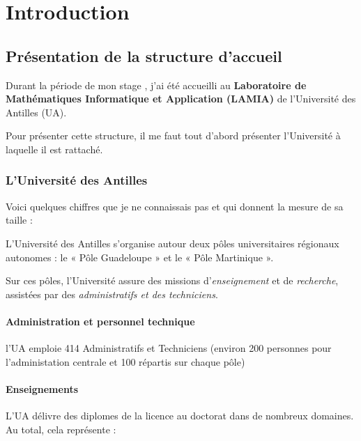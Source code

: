 \hypertarget{Introduction}{%
\chapter{Introduction}\label{Introduction}}

\section{Présentation de la structure
d'accueil}

Durant la période de mon stage , j'ai été accueilli au
\textbf{Laboratoire de Mathématiques Informatique et Application
(LAMIA)} de l'Université des Antilles (UA).

Pour présenter cette structure, il me faut tout d'abord présenter
l'Université à laquelle il est rattaché.

\hypertarget{lUniversite-des-antilles}{%
\subsection{L'Université des Antilles}\label{luniversite-des-antilles}}

Voici quelques chiffres que je ne connaissais pas et qui donnent la
mesure de sa taille :

L'Université des Antilles s'organise autour deux pôles universitaires
régionaux autonomes : le « Pôle Guadeloupe » et le « Pôle Martinique ».

Sur ces pôles, l'Université assure des missions d'\emph{enseignement} et
de \emph{recherche}, assistées par des \emph{administratifs et des
techniciens}.

\hypertarget{administration-et-personnel-technique}{%
\subsubsection{Administration et personnel
technique}
\label{administration-et-personnel-technique}}

l'UA emploie 414 Administratifs et Techniciens (environ 200 personnes
pour l'administation centrale et 100 répartis sur chaque pôle)

\hypertarget{enseignements}{%
\subsubsection{Enseignements}\label{enseignements}}

L'UA délivre des diplomes de la licence au doctorat dans de nombreux
domaines. Au total, cela représente :

